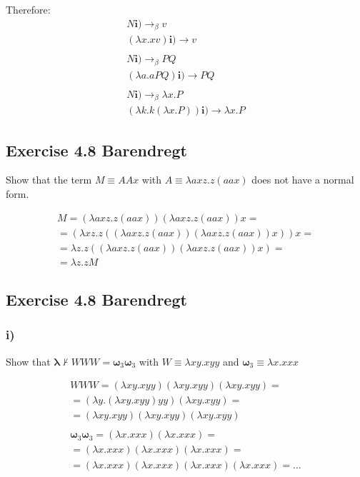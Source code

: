 \documentclass[11pt]{article}
\begin{document}
Therefore:
\begin{gather*}
N \mathbf{i)} \rightarrow _\beta v \\
(\lambda x.xv)\mathbf{i)} \rightarrow v \\
\\
N \mathbf{i)} \rightarrow _\beta PQ \\
(\lambda a.a PQ)\mathbf{i)} \rightarrow PQ \\
\\
N \mathbf{i)} \rightarrow _\beta \lambda x.P \\
(\lambda k.k (\lambda x.P)) \mathbf{i)} \rightarrow \lambda x.P
\end{gather*}


\subsection*{Exercise 4.8 Barendregt}
Show that the term $M \equiv AAx$ with $A \equiv \lambda axz.z(aax)$ does not have a normal form.

\begin{gather*}
M = (\lambda axz.z(aax))(\lambda axz.z(aax))x = \\
= (\lambda xz.z((\lambda axz.z(aax))(\lambda axz.z(aax))x))x = \\
= \lambda z.z((\lambda axz.z(aax))(\lambda axz.z(aax))x) = \\
= \lambda z.zM
\end{gather*}


\subsection*{Exercise 4.8 Barendregt}
\subsubsection*{i)}
Show that $\mathbf{\lambda} \not \vdash WWW = \mathbf{\omega}_3 \mathbf{\omega}_3$ with $W \equiv \lambda xy.xyy$ and $\mathbf{\omega}_3 \equiv \lambda x.xxx$

\begin{gather*}
WWW = (\lambda xy.xyy)(\lambda xy.xyy)(\lambda xy.xyy) =\\
= (\lambda y.(\lambda xy.xyy)yy)(\lambda xy.xyy) = \\
= (\lambda xy.xyy)(\lambda xy.xyy)(\lambda xy.xyy) \\
\\
\mathbf{\omega}_3 \mathbf{\omega}_3 = (\lambda x.xxx)(\lambda x.xxx) = \\
= (\lambda x.xxx)(\lambda x.xxx)(\lambda x.xxx) = \\
= (\lambda x.xxx)(\lambda x.xxx)(\lambda x.xxx)(\lambda x.xxx) = \dots \\
\end{gather*}
\end{document}
